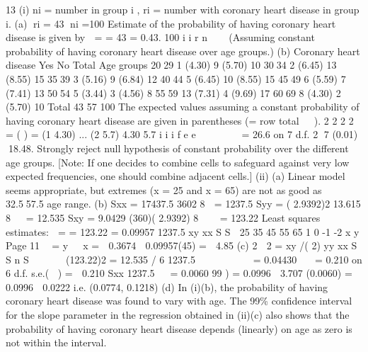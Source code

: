 \documentclass[a4paper,12pt]{article}
\begin{document}
13 (i) ni = number in group i , ri = number with coronary heart disease in group i.
(a) ri = 43 ni =100
Estimate of the probability of having coronary heart disease is given by
 = = 43 = 0.43.
100
i
i
r
n



(Assuming constant probability of having coronary heart disease over
age groups.)
(b)
Coronary heart
disease
Yes No Total
Age groups 2029 1
(4.30)
9
(5.70)
10
3034 2
(6.45)
13
(8.55)
15
3539 3
(5.16)
9
(6.84)
12
4044 5
(6.45)
10
(8.55)
15
4549 6
(5.59)
7
(7.41)
13
5054 5
(3.44)
3
(4.56)
8
5559 13
(7.31)
4
(9.69)
17
6069 8
(4.30)
2
(5.70)
10
Total 43 57 100
The expected values assuming a constant probability of having coronary heart disease
are given in parentheses (= row total  ).
2 2 2
2 = ( ) = (1 4.30) ... (2 5.7)
4.30 5.7
i i
i
f e
e
  
    = 26.6 on 7 d.f.
2
7 (0.01) 18.48.
Strongly reject null hypothesis of constant probability over the
different age groups. [Note: If one decides to combine cells to
safeguard against very low expected frequencies, one should combine
adjacent cells.]
(ii) (a)
Linear model seems appropriate, but extremes (x = 25 and x = 65) are
not as good as 32.557.5 age range.
(b) Sxx = 17437.5
3602
8  = 1237.5
Syy =
( 2.9392)2 13.615
8

 = 12.535
Sxy = 9.0429 (360)( 2.9392)
8

  = 123.22
Least squares estimates:
 = = 123.22 = 0.09957
1237.5
xy
xx
S
S 
25 35 45 55 65
1
0
-1
-2
x
y
Page 11
 = y  x =  0.3674  0.09957(45) =  4.85
(c)
2
 2 = xy /( 2)
yy
xx
S
S n
S
 
    
 
 
(123.22)2 = 12.535 / 6
1237.5
 
    
 
= 0.04430
  = 0.210 on 6 d.f.
s.e.(
) =
 0.210
Sxx 1237.5

 = 0.0060
99%
)
= 0.0996  3.707 (0.0060)
= 0.0996  0.0222 i.e. (0.0774, 0.1218)
(d) In (i)(b), the probability of having coronary heart disease was found to vary with age. The 99\% confidence interval for the slope parameter in the regression obtained in (ii)(c) also shows that the probability of having coronary heart disease depends (linearly) on age as zero is not within the interval.
\end{document}
